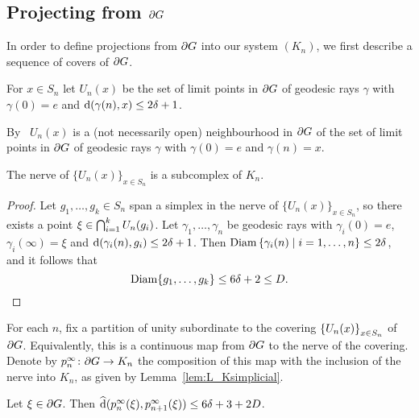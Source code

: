 \documentclass[a4paper]{article}
\begin{document}
\subsection{Projecting from $\partial G$}

In order to define projections from $\partial G$ into our system $(K_n)$, we
first describe a sequence of covers of $\partial G$.

\begin{definition}
  For $x \in S_n$ let $U_n(x)$ be the set of limit points in $\partial G$ of 
  geodesic rays $\gamma$ with $\gamma(0) = e$ and $\operatorname{d}(\gamma(n), x) \leq 
  2\delta+1$.  
  
  By~\cite[III.H.3.6]{bridsonhaefliger99} $U_n(x)$ is a (not necessarily open)
  neighbourhood in $\partial G$ of the set of limit points in $\partial G$ of
  geodesic rays $\gamma$ with $\gamma(0) = e$ and $\gamma(n) = x$.
\end{definition}

\begin{lemma}\label{lem:L_Ksimplicial}
  The nerve of $\{U_n(x)\}_{x \in S_n}$ is a subcomplex of $K_n$.
\end{lemma}

\begin{proof}
  Let $g_1, \dotsc, g_k \in S_n$ span a simplex in the nerve of
  $\{U_n(x)\}_{x \in S_n}$, so there exists a point $\xi \in
  \bigcap_{i=1}^k U_n(g_i)$.  Let $\gamma_1, \dotsc, \gamma_n$ be
  geodesic rays with $\gamma_i(0) = e$, $\gamma_i(\infty) = \xi$ and
  $\operatorname{d}(\gamma_i(n), g_i) \leq 2\delta+1$.  Then $\operatorname{Diam}\left\{\gamma_i(n)
  \mid i=1, \dotsc, n\right\} \leq 2\delta$, and it follows that
  \begin{equation*}
    \operatorname{Diam}\{g_1, \dotsc, g_k\} \leq 6\delta+ 2 \leq D.\qedhere
  \end{equation*}
\end{proof}

\begin{definition}
  For each $n$, fix a partition of unity subordinate to the covering
  $\left\{U_n(x)\right\}_{x \in S_n}$ of $\partial G$. Equivalently, this is a
  continuous map from $\partial G$ to the nerve of the covering. Denote by
  $p^\infty_n\colon \partial G \to K_n$ the composition of this map with the
  inclusion of the nerve into $K_n$, as given by Lemma~\ref{lem:L_Ksimplicial}.
\end{definition}

\begin{lemma}\label{lem:close_projections}
  Let $\xi \in \partial G$. Then $\operatorname{\widehat{d}}(p^\infty_n(\xi),
  p^\infty_{n+1}(\xi)) \leq 6\delta+3 + 2D$.
\end{lemma}
\end{document}
